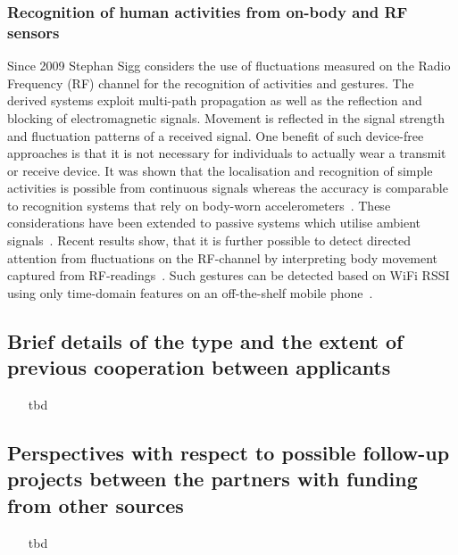 \documentclass[12pt]{article}
\begin{document}
\subsubsection*{Recognition of human activities from on-body and RF sensors}
Since 2009 Stephan Sigg considers the use of fluctuations measured on the Radio Frequency (RF) channel for the recognition of activities and gestures.
The derived systems exploit multi-path propagation as well as the reflection and blocking of electromagnetic signals.
Movement is reflected in the signal strength and fluctuation patterns of a received signal.
One benefit of such device-free approaches is that it is not necessary for individuals to actually wear a transmit or receive device.
It was shown that the localisation and recognition of simple activities is possible from continuous signals whereas the accuracy is comparable to recognition systems that rely on body-worn accelerometers~\cite{Pervasive_Sigg_2012}. 
These considerations have been extended to passive systems which utilise ambient signals~\cite{Pervasive_Sigg_2013}.
Recent results show, that it is further possible to detect directed attention from fluctuations on the RF-channel by interpreting body movement captured from RF-readings~\cite{Pervasive_Shi_2014}.
Such gestures can be detected based on WiFi RSSI using only time-domain features on an off-the-shelf mobile phone~\cite{RFSensing_Sigg_2014}.


\subsection*{Brief details of the type and the extent of previous cooperation between applicants}
\begin{itemize}
 \item[\color{blue}tbd]
\end{itemize}
\subsection*{Perspectives with respect to possible follow-up projects between the partners with funding from other sources}
\begin{itemize}
 \item[\color{blue}tbd]
\end{itemize}
\end{document}
